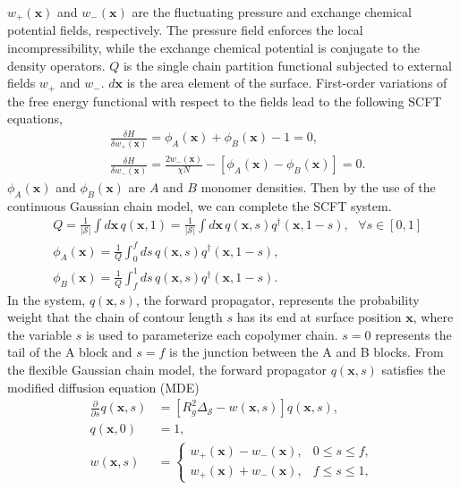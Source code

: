 \documentclass[final,1p,times]{elsarticle}
\newcommand{\bx}{\mathbf{x}}
\newcommand{\calS}{\mathcal{S}}
\begin{document}
$w_+(\bx)$ and $w_-(\bx)$ are the fluctuating pressure and exchange
chemical potential fields, respectively. The pressure field
enforces the local incompressibility, while the exchange chemical
potential is conjugate to the density operators.
$Q$ is the single chain partition 
functional subjected to external fields $w_+$ and $w_-$.
$d\bx$ is the area element of the surface.
First-order variations of the free energy functional with respect
to the fields lead to the following SCFT equations,
\begin{align}
	& \frac{\delta H}{\delta w_+(\bx)} = \phi_A(\bx) + \phi_B(\bx) - 1 = 0,
	\label{eq:scftwplus}
	\\
	& \frac{\delta H}{\delta w_-(\bx)} = 
   \frac{2 w_-(\bx)}{\chi N} - [\phi_A(\bx) - \phi_B(\bx)] = 0.
	\label{eq:scftwminus}
\end{align}
$\phi_A(\bx)$ and $\phi_B(\bx)$ are $A$ and $B$ monomer densities. 
Then by the use of the continuous Gaussian chain model,
we can complete the SCFT system.
\begin{align}
  & Q = \frac{1}{|\calS|}\int d\bx\,q(\bx,1) = \frac{1}{|\calS|}\int
    d\bx\,q(\bx,s)q^\dag(\bx,1-s), ~~~ \forall s \in [0,1]
  \\
  & \phi_A(\bx) =
  \frac{1}{Q}\int_0^f ds\,q(\bx,s)q^{\dag}(\bx,1-s),
  \label{eq:scft:phiA}
  \\
  & \phi_B(\bx) =
  \frac{1}{Q}\int_f^1 ds\,q(\bx,s)q^{\dag}(\bx,1-s).
  \label{eq:scft:phiB}
\end{align}
In the system, $q(\bx,s)$, the forward propagator, represents the probability
weight that the chain of contour length $s$ has its end at surface position
$\bx$, where the variable $s$ is used to parameterize each copolymer chain. $s
= 0$ represents the tail of the A block and $s = f$ is the junction between the
A and B blocks.  From the flexible Gaussian chain model, the forward propagator
$q(\bx,s)$ satisfies the modified diffusion equation (MDE)
\begin{equation}
  \label{eq:MDE}
	\begin{aligned}
  \frac{\partial }{\partial s}q(\bx,s) &=
	[R_g^2 \Delta_{\calS} - w(\bx,s)] q(\bx,s), 
	\\
  q(\bx,0) &= 1,
  \\
	w(\bx,s) &= \left\{   
	\begin{array}{rl}
		w_+(\bx)-w_-(\bx), &  0\leq s \leq f,
		\\
		w_+(\bx) +w_-(\bx), &  f\leq s \leq 1,
	\end{array}
\right.
	\end{aligned}
\end{equation}
\end{document}
